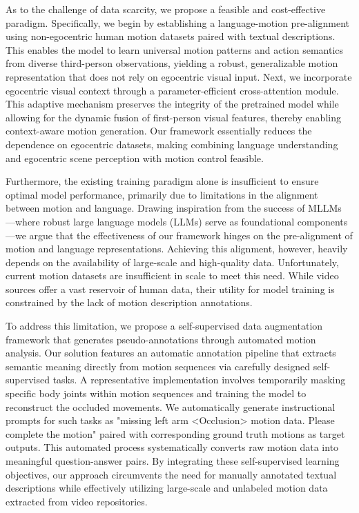 As to the challenge of data scarcity, we propose a feasible and cost-effective paradigm.
Specifically, we begin by establishing a language-motion pre-alignment using non-egocentric human motion datasets paired with textual descriptions. This enables the model to learn universal motion patterns and action semantics from diverse third-person observations, yielding a robust, generalizable motion representation that does not rely on egocentric visual input.
Next, we incorporate egocentric visual context through a parameter-efficient cross-attention module. This adaptive mechanism preserves the integrity of the pretrained model while allowing for the dynamic fusion of first-person visual features, thereby enabling context-aware motion generation. 
Our framework essentially reduces the dependence on egocentric datasets, making combining language understanding and egocentric scene perception with motion control feasible.

Furthermore, the existing training paradigm alone is insufficient to ensure optimal model performance, primarily due to limitations in the alignment between motion and language. Drawing inspiration from the success of MLLMs \cite{liu2023llava, zhang2023video}—where robust large language models (LLMs) serve as foundational components—we argue that the effectiveness of our framework hinges on the pre-alignment of motion and language representations. Achieving this alignment, however, heavily depends on the availability of large-scale and high-quality data. Unfortunately, current motion datasets are insufficient in scale to meet this need. While video sources offer a vast reservoir of human data, their utility for model training is constrained by the lack of motion description annotations.


To address this limitation, we propose a self-supervised data augmentation framework that generates pseudo-annotations through automated motion analysis.
Our solution features an automatic annotation pipeline that extracts semantic meaning directly from motion sequences via carefully designed self-supervised tasks.
A representative implementation involves temporarily masking specific body joints within motion sequences and training the model to reconstruct the occluded movements. We automatically generate instructional prompts for such tasks as "missing left arm <Occlusion> motion data. Please complete the motion" paired with corresponding ground truth motions as target outputs. This automated process systematically converts raw motion data into meaningful question-answer pairs.
By integrating these self-supervised learning objectives, our approach circumvents the need for manually annotated textual descriptions while effectively utilizing large-scale and unlabeled motion data extracted from video repositories.

